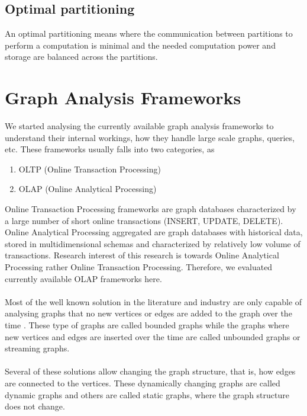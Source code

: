 \documentclass[12pt]{report}
\numberwithin{figure}{section}
\numberwithin{table}{section}
\begin{document}
\subsection{Optimal partitioning}
	An optimal partitioning means where the communication between partitions to perform a computation is minimal and the needed computation power and storage are balanced across the partitions.

\section{Graph Analysis Frameworks}
We started analysing the currently available graph analysis frameworks to understand their internal workings, how they handle large scale graphs, queries, etc. These frameworks usually falls into two categories, as
\begin{enumerate}
\item OLTP (Online Transaction Processing)
\item OLAP (Online Analytical Processing)
\end{enumerate}

Online Transaction Processing frameworks are graph databases characterized by a large number of short online transactions (INSERT, UPDATE, DELETE). Online Analytical Processing aggregated are graph databases with historical data, stored in multidimensional schemas and characterized by relatively low volume of transactions. Research interest of this research is towards Online Analytical Processing rather Online Transaction Processing. Therefore, we evaluated currently available OLAP frameworks here.

\paragraph{}

Most of the well known solution in the literature and industry are only capable of analysing graphs that no new vertices or edges are added to the graph over the time\cite{Pregel} \cite{Graphlab}. These type of graphs are called bounded graphs while the graphs where new vertices and edges are inserted  over the time are called unbounded graphs or streaming graphs\cite{Fennel}\cite{S-PowerGraph}. 

\paragraph{}

Several of these solutions allow changing the graph structure, that is, how edges are connected to the vertices. These dynamically changing graphs are called dynamic graphs and others are called static graphs, where the graph structure does not change\cite{X-stream}.
\end{document}
